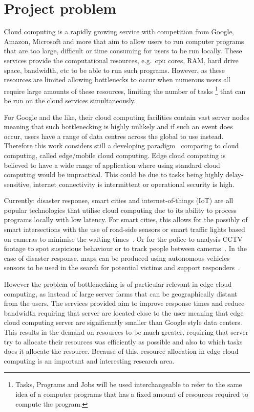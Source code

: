 \chapter{Project problem}\label{ch:project-problem}
Cloud computing is a rapidly growing service with competition from Google, Amazon, Microsoft and more that aim to
allow users to run computer programs that are too large, difficult or time consuming for users to be run locally.
These services provide the computational resources, e.g.\ cpu cores, RAM, hard drive space, bandwidth, etc
to be able to run such programs. However, as these resources are limited allowing bottlenecks to occur when
numerous users all require large amounts of these resources, limiting the number of tasks
\footnote{Tasks, Programs and Jobs will be used interchangeable to refer to the same idea of a computer programs that
has a fixed amount of resources required to compute the program.} that can be run on the cloud services simultaneously.

For Google and the like, their cloud computing facilities contain vast server nodes meaning that such bottlenecking
is highly unlikely and if such an event does occur, users have a range of data centres across the global to use instead.
Therefore this work considers still a developing paradigm~\citep{mobile_edge_survey} comparing to cloud computing,
called edge/mobile cloud computing. Edge cloud computing is believed to have a wide range of application where using
standard cloud computing would be impractical. This could be due to tasks being highly delay-sensitive,
internet connectivity is intermittent or operational security is high.

Currently: disaster response, smart cities and internet-of-things (IoT) are all popular technologies that utilise
cloud computing due to its ability to process programs locally with low latency. For smart cities, this
allows for the possibly of smart intersections with the use of road-side sensors or smart traffic lights based
on cameras to minimise the waiting times~\citep{smart_cities_traffic_lights}. Or for the police to analysis
CCTV footage to spot suspicious behaviour or to track people between cameras~\citep{Sreenu2019}. In the case
of disaster response, maps can be produced using autonomous vehicles sensors to be used in the search for potential
victims and support responders~\citep{smart_disaster_management}.

However the problem of bottlenecking is of particular relevant in edge cloud computing, as instead of large server farms
that can be geographically distant from the users. The services provided aim to improve response times and reduce
bandwidth requiring that server are located close to the user meaning that edge cloud computing server are significantly
smaller than Google style data centers. This results in the demand on resources to be much greater, requiring that
server try to allocate their resources was efficiently as possible and also to which tasks does it
allocate the resource. Because of this, resource allocation in edge cloud computing is an important and
interesting research area.

